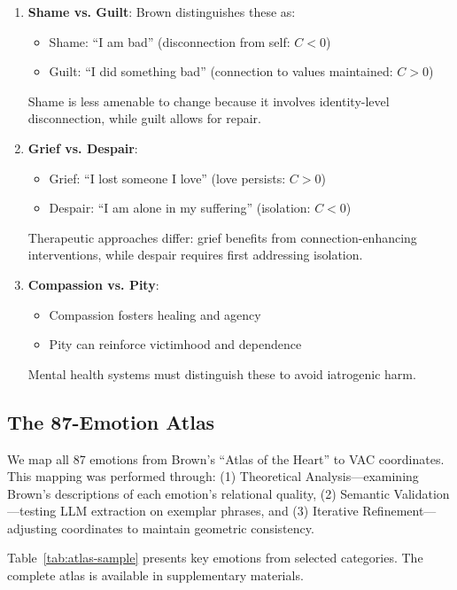 \documentclass[10pt,twocolumn]{article}
\begin{document}
\begin{enumerate}
    \item \textbf{Shame vs. Guilt}: Brown distinguishes these as:
    \begin{itemize}
        \item Shame: ``I am bad'' (disconnection from self: $C < 0$)
        \item Guilt: ``I did something bad'' (connection to values maintained: $C > 0$)
    \end{itemize}
    Shame is less amenable to change because it involves identity-level disconnection, while guilt allows for repair.

    \item \textbf{Grief vs. Despair}:
    \begin{itemize}
        \item Grief: ``I lost someone I love'' (love persists: $C > 0$)
        \item Despair: ``I am alone in my suffering'' (isolation: $C < 0$)
    \end{itemize}
    Therapeutic approaches differ: grief benefits from connection-enhancing interventions, while despair requires first addressing isolation.

    \item \textbf{Compassion vs. Pity}:
    \begin{itemize}
        \item Compassion fosters healing and agency
        \item Pity can reinforce victimhood and dependence
    \end{itemize}
    Mental health systems must distinguish these to avoid iatrogenic harm.
\end{enumerate}

\subsection{The 87-Emotion Atlas}

We map all 87 emotions from Brown's ``Atlas of the Heart'' to VAC coordinates. This mapping was performed through: (1) Theoretical Analysis—examining Brown's descriptions of each emotion's relational quality, (2) Semantic Validation—testing LLM extraction on exemplar phrases, and (3) Iterative Refinement—adjusting coordinates to maintain geometric consistency.

Table~\ref{tab:atlas-sample} presents key emotions from selected categories. The complete atlas is available in supplementary materials.
\end{document}
